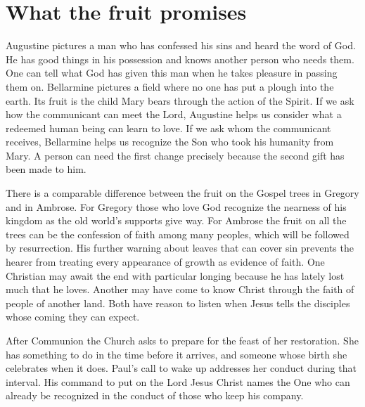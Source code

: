 \section{What the fruit promises}

Augustine pictures a man who has confessed his sins and heard the word of God. He has good things in his possession and knows another person who needs them. One can tell what God has given this man when he takes pleasure in passing them on. Bellarmine pictures a field where no one has put a plough into the earth. Its fruit is the child Mary bears through the action of the Spirit. If we ask how the communicant can meet the Lord, Augustine helps us consider what a redeemed human being can learn to love. If we ask whom the communicant receives, Bellarmine helps us recognize the Son who took his humanity from Mary. A person can need the first change precisely because the second gift has been made to him.

There is a comparable difference between the fruit on the Gospel trees in Gregory and in Ambrose. For Gregory those who love God recognize the nearness of his kingdom as the old world's supports give way. For Ambrose the fruit on all the trees can be the confession of faith among many peoples, which will be followed by resurrection. His further warning about leaves that can cover sin prevents the hearer from treating every appearance of growth as evidence of faith. One Christian may await the end with particular longing because he has lately lost much that he loves. Another may have come to know Christ through the faith of people of another land. Both have reason to listen when Jesus tells the disciples whose coming they can expect.

After Communion the Church asks to prepare for the feast of her restoration. She has something to do in the time before it arrives, and someone whose birth she celebrates when it does. Paul's call to wake up addresses her conduct during that interval. His command to put on the Lord Jesus Christ names the One who can already be recognized in the conduct of those who keep his company.
